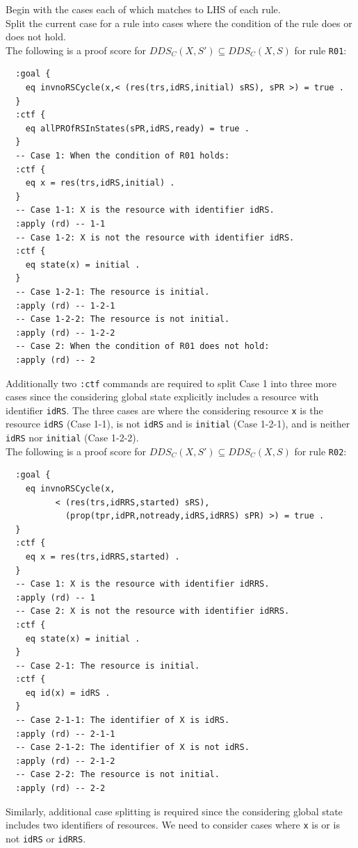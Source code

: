 \documentclass[12pt]{report}
\begin{document}
 Begin with the cases each of which matches to
LHS of each rule. \\ 
 Split the current case for a rule into
cases where the condition of the rule does or does not hold. \\

The following is a proof score for $DDS\!_C(X,S')\subseteq DDS\!_C(X,S)$ for
rule {\tt R01}:
\small
\begin{verbatim}
  :goal {
    eq invnoRSCycle(x,< (res(trs,idRS,initial) sRS), sPR >) = true .
  }
  :ctf {
    eq allPROfRSInStates(sPR,idRS,ready) = true .
  }
  -- Case 1: When the condition of R01 holds:
  :ctf {
    eq x = res(trs,idRS,initial) .
  }
  -- Case 1-1: X is the resource with identifier idRS.
  :apply (rd) -- 1-1
  -- Case 1-2: X is not the resource with identifier idRS.
  :ctf {
    eq state(x) = initial .
  }
  -- Case 1-2-1: The resource is initial.
  :apply (rd) -- 1-2-1
  -- Case 1-2-2: The resource is not initial.
  :apply (rd) -- 1-2-2
  -- Case 2: When the condition of R01 does not hold:
  :apply (rd) -- 2
\end{verbatim}
\normalsize
Additionally two {\tt :ctf} commands are required to split Case 1 into
three more cases since the considering global state explicitly
includes a resource with identifier {\tt idRS}. The three cases are
where the considering resource {\tt x} is the resource {\tt idRS}
(Case 1-1), is not {\tt idRS} and is {\tt initial} (Case 1-2-1), and
is neither {\tt idRS} nor {\tt initial} (Case 1-2-2).\\

The following is a proof score for $DDS\!_C(X,S')\subseteq DDS\!_C(X,S)$ for
rule {\tt R02}:
\small
\begin{verbatim}
  :goal {
    eq invnoRSCycle(x,
          < (res(trs,idRRS,started) sRS), 
            (prop(tpr,idPR,notready,idRS,idRRS) sPR) >) = true .
  }
  :ctf {
    eq x = res(trs,idRRS,started) .
  }
  -- Case 1: X is the resource with identifier idRRS.
  :apply (rd) -- 1
  -- Case 2: X is not the resource with identifier idRRS.
  :ctf {
    eq state(x) = initial .
  }
  -- Case 2-1: The resource is initial.
  :ctf {
    eq id(x) = idRS .
  }
  -- Case 2-1-1: The identifier of X is idRS.
  :apply (rd) -- 2-1-1
  -- Case 2-1-2: The identifier of X is not idRS.
  :apply (rd) -- 2-1-2
  -- Case 2-2: The resource is not initial.
  :apply (rd) -- 2-2
\end{verbatim}
\normalsize
Similarly, additional case splitting is required since the considering
global state includes two identifiers of resources. We need to
consider cases where {\tt x} is or is not {\tt idRS} or {\tt idRRS}.
\end{document}
